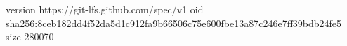 version https://git-lfs.github.com/spec/v1
oid sha256:8ceb182dd4f52da5d1c912fa9b66506c75e600fbe13a87c246e7ff39bdb24fe5
size 280070
